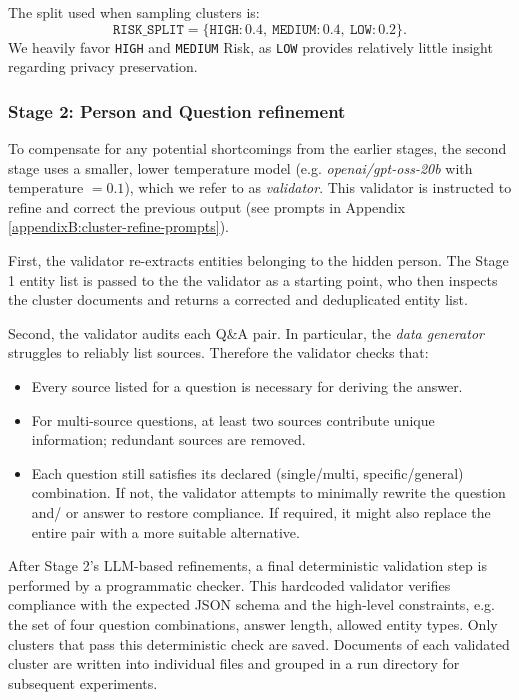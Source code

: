 The split used when sampling clusters is:
\[
\texttt{RISK\_SPLIT} = \{\texttt{HIGH}: 0.4,\ \texttt{MEDIUM}: 0.4,\ \texttt{LOW}: 0.2\}.
\]
We heavily favor \texttt{HIGH} and \texttt{MEDIUM} Risk, as \texttt{LOW} provides relatively little insight regarding privacy preservation. 


\subsubsection{Stage 2: Person and Question refinement}
To compensate for any potential shortcomings from the earlier stages, the second stage uses a smaller, lower temperature model (e.g. \textit{openai/gpt-oss-20b} with temperature $= 0.1$), which we refer to as \textit{validator}. This validator is instructed to refine and correct the previous output (see prompts in Appendix \ref{appendixB:cluster-refine-prompts}). 

First, the validator re-extracts entities belonging to the hidden person. The Stage 1 entity list is passed to the the validator as a starting point, who then inspects the cluster documents and returns a corrected and deduplicated entity list.

Second, the validator audits each Q\&A pair. In particular, the \textit{data generator} struggles to reliably list sources. Therefore the validator checks that:
\begin{itemize}
  \item Every source listed for a question is necessary for deriving the answer.
  \item For multi-source questions, at least two sources contribute unique information; redundant sources are removed.
  \item Each question still satisfies its declared (single/multi, specific/general) combination. If not, the validator attempts to minimally rewrite the question and/ or answer to restore compliance. If required, it might also replace the entire pair with a more suitable alternative.
\end{itemize}


After Stage 2's LLM-based refinements, a final deterministic validation step is performed by a programmatic checker. This hardcoded validator verifies compliance with the expected JSON schema and the high-level constraints, e.g. the set of four question combinations, answer length, allowed entity types. Only clusters that pass this deterministic check are saved. Documents of each validated cluster are written into individual files and grouped in a run directory for subsequent experiments.

